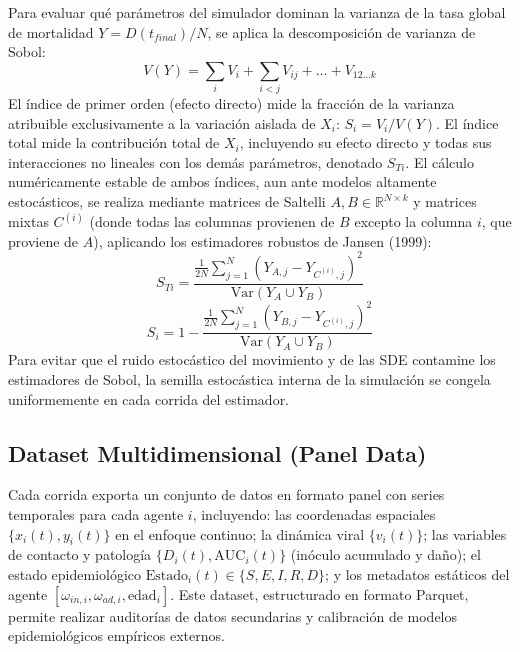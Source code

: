 \documentclass[conference]{IEEEtran}
\begin{document}
Para evaluar qué parámetros del simulador dominan la varianza de la tasa global de mortalidad $Y=D(t_{final})/N$, se aplica la descomposición de varianza de Sobol:
\begin{equation}
V(Y) = \sum_{i} V_i + \sum_{i < j} V_{ij} + \dots + V_{12\dots k}
\end{equation}
El índice de primer orden (efecto directo) mide la fracción de la varianza atribuible exclusivamente a la variación aislada de $X_i$: $S_i = V_i/V(Y)$. El índice total mide la contribución total de $X_i$, incluyendo su efecto directo y todas sus interacciones no lineales con los demás parámetros, denotado $S_{Ti}$. El cálculo numéricamente estable de ambos índices, aun ante modelos altamente estocásticos, se realiza mediante matrices de Saltelli $A,B\in\mathbb{R}^{N\times k}$ y matrices mixtas $C^{(i)}$ (donde todas las columnas provienen de $B$ excepto la columna $i$, que proviene de $A$), aplicando los estimadores robustos de Jansen (1999):
\begin{equation}
S_{Ti} = \frac{\frac{1}{2N} \sum_{j=1}^{N} (Y_{A, j} - Y_{C^{(i)}, j})^2}{\text{Var}(Y_A \cup Y_B)}
\end{equation}
\begin{equation}
S_i = 1 - \frac{\frac{1}{2N} \sum_{j=1}^{N} (Y_{B, j} - Y_{C^{(i)}, j})^2}{\text{Var}(Y_A \cup Y_B)}
\end{equation}
Para evitar que el ruido estocástico del movimiento y de las SDE contamine los estimadores de Sobol, la semilla estocástica interna de la simulación se congela uniformemente en cada corrida del estimador.

\subsection{Dataset Multidimensional (Panel Data)}
Cada corrida exporta un conjunto de datos en formato panel con series temporales para cada agente $i$, incluyendo: las coordenadas espaciales $\{x_i(t), y_i(t)\}$ en el enfoque continuo; la dinámica viral $\{v_i(t)\}$; las variables de contacto y patología $\{D_i(t), \text{AUC}_i(t)\}$ (inóculo acumulado y daño); el estado epidemiológico $\text{Estado}_i(t)\in\{S,E,I,R,D\}$; y los metadatos estáticos del agente $[\omega_{in,i}, \omega_{ad,i}, \text{edad}_i]$. Este dataset, estructurado en formato Parquet, permite realizar auditorías de datos secundarias y calibración de modelos epidemiológicos empíricos externos.
\end{document}

